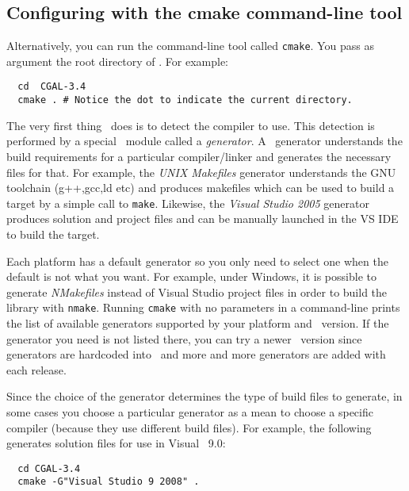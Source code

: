 

\subsection{Configuring \cgal{} with the cmake command-line tool }

Alternatively, you can run the command-line tool called
\texttt{cmake}. You pass as argument the root directory of
\cgal. For example:

{\ccTexHtml{\scriptsize}{}
\begin{verbatim}
  cd  CGAL-3.4
  cmake . # Notice the dot to indicate the current directory.
\end{verbatim}
}


The very first thing \cmake\ does is to detect the compiler to use.
This detection is performed by a special \cmake\ module called a {\em generator}. A
\cmake\ generator understands the build requirements for a particular compiler/linker
 and generates the necessary files for that. For example, the 
{\em UNIX Makefiles} generator understands the GNU toolchain (g++,gcc,ld etc) and produces makefiles
which can be used to build a target by a simple call to \texttt{make}.
Likewise, the {\em Visual Studio 2005} generator produces solution and project files and can be manually
launched in the VS IDE to build the target.

Each platform has a default generator so you only need to select one when the default is
not what you want. 
For example, under Windows, it is possible to generate {\em NMakefiles}
instead of Visual Studio project files in order to build the library with \texttt{nmake}.
Running \texttt{cmake} with no parameters in a command-line prints the list of available generators supported 
by your platform and \cmake\ version. If the generator you need is not listed there, you can
try a newer \cmake\ version since generators are hardcoded into \cmake\ and more and
more generators are added with each release.

Since the choice of the generator determines the type of build files to generate, in some cases
you choose a particular generator as a mean to choose a specific compiler (because they use different 
build files). For example, the following generates solution files for use in Visual \CC\ 9.0:

{\ccTexHtml{\scriptsize}{}
\begin{verbatim}
  cd CGAL-3.4
  cmake -G"Visual Studio 9 2008" . 
\end{verbatim}
}

